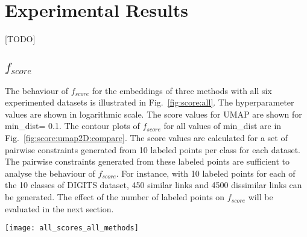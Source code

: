 \section{Experimental Results}\label{sec:results}

[TODO]

\subsection{$f_{score}$}\label{sec:result:fscore}
The behaviour of $f_{score}$ for the embeddings of three methods with all six experimented datasets is illustrated in Fig.~\ref{fig:score:all}.
The hyperparameter values are shown in logarithmic scale.
The score values for UMAP are shown for {min\_dist= 0.1}.
The contour plots of $f_{score}$ for all values of {min\_dist} are in Fig.~\ref{fig:score:umap2D:compare}.
The score values are calculated for a set of pairwise constraints generated from 10 labeled points per class for each dataset.
The pairwise constraints generated from these labeled points are sufficient to analyse the behaviour of $f_{score}$.   
For instance, with 10 labeled points for each of the 10 classes of DIGITS dataset, 450 similar links and 4500 dissimilar links can be generated.
The effect of the number of labeled points on $f_{score}$ will be evaluated in the next section.

\begin{figure*}
    \centering
    \texttt{[image: all\_scores\_all\_methods]}
    \caption{$f_{score}$ for all three methods for all six datasets.}
    \label{fig:score:all}
\end{figure*}

